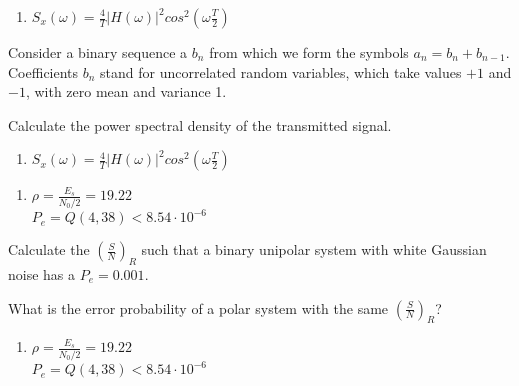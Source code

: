 \documentclass[idioma,boletin]{uah}
\begin{document}
{

\begin{enumerate}
	\item $S_x(\omega) = \frac{4}{T} |H(\omega)|^2 cos^2 \left ( \omega \frac{T}{2} \right ) $
\end{enumerate}
}
{

Consider a binary sequence a $b_n$ from which we form the symbols $a_n = b_n + b_{n-1}$. Coefficients $b_n$ stand for uncorrelated random variables, which take values $+1$ and $-1$, with zero mean and variance 1. 

Calculate the power spectral density of the transmitted signal.

}
{

\begin{enumerate}
	\item $S_x(\omega) = \frac{4}{T} |H(\omega)|^2 cos^2 \left ( \omega \frac{T}{2} \right ) $
\end{enumerate}
}




{
\begin{enumerate}
	\item $\rho = \frac{E_s}{N_0/2} = 19.22$ \\
		$P_e = Q(4,38) < 8.54 \cdot 10^{-6}$
\end{enumerate}
}
{

Calculate the $\left ( \frac{S}{N} \right )_R$ such that a binary unipolar system with white Gaussian noise has a $P_e= 0.001$. 

What is the error probability of a polar system with the same $\left ( \frac{S}{N} \right )_R$?

}
{
\begin{enumerate}
	\item $\rho = \frac{E_s}{N_0/2} = 19.22$ \\
		$P_e = Q(4,38) < 8.54 \cdot 10^{-6}$
\end{enumerate}
}
\end{document}
